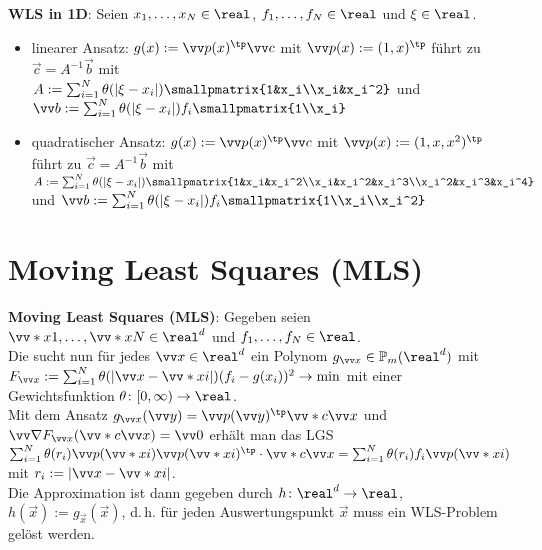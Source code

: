 \textbf{WLS in 1D}:
Seien $x_1, \dotsc, x_N \in \real$, $f_1, \dotsc, f_N \in \real$ und $\xi \in \real$.
\begin{itemize}
    \item
    linearer Ansatz:
    $g(x) := \vec{p}(x)^\tp \vec{c}$ mit $\vec{p}(x) := (1, x)^\tp$
    führt zu $\vec{c} = A^{-1} \vec{b}$ mit\\
    $A := \sum_{i=1}^N \theta(|\xi - x_i|) \smallpmatrix{1&x_i\\x_i&x_i^2}$ und
    $\vec{b} := \sum_{i=1}^N \theta(|\xi - x_i|) f_i \smallpmatrix{1\\x_i}$

    \item
    quadratischer Ansatz:
    $g(x) := \vec{p}(x)^\tp \vec{c}$ mit $\vec{p}(x) := (1, x, x^2)^\tp$
    führt zu $\vec{c} = A^{-1} \vec{b}$ mit\\
    $A := \sum_{i=1}^N \theta(|\xi - x_i|)
    \smallpmatrix{1&x_i&x_i^2\\x_i&x_i^2&x_i^3\\x_i^2&x_i^3&x_i^4}$ und
    $\vec{b} := \sum_{i=1}^N \theta(|\xi - x_i|) f_i \smallpmatrix{1\\x_i\\x_i^2}$
\end{itemize}

\pagebreak

\section{%
    Moving Least Squares (MLS)%
}

\textbf{Moving Least Squares (MLS)}:
Gegeben seien $\vecs{x}{1}, \dotsc, \vecs{x}{N} \in \real^d$ und
$f_1, \dotsc, f_N \in \real$.\\
Die  sucht nun für jedes $\vec{x} \in \real^d$
ein Polynom $g_{\vec{x}} \in \PP_m(\real^d)$ mit\\
$F_{\vec{x}} := \sum_{i=1}^N \theta(|\vec{x} - \vecs{x}{i}|) (f_i - g(x_i))^2 \to \min$
mit einer Gewichtsfunktion $\theta\colon [0, \infty) \to \real$.\\
Mit dem Ansatz $g_{\vec{x}}(\vec{y}) = \vec{p}(\vec{y})^\tp \vecs{c}{\vec{x}}$ und
$\vec{\nabla} F_{\vec{x}}(\vecs{c}{\vec{x}}) = \vec{0}$ erhält man das LGS\\
$\sum_{i=1}^N \theta(r_i) \vec{p}(\vecs{x}{i}) \vec{p}(\vecs{x}{i})^\tp \cdot \vecs{c}{\vec{x}}
= \sum_{i=1}^N \theta(r_i) f_i \vec{p}(\vecs{x}{i})$ mit $r_i := |\vec{x} - \vecs{x}{i}|$.\\
Die Approximation ist dann gegeben durch
$h\colon \real^d \to \real$, $h(\vec{x}) := g_{\vec{x}}(\vec{x})$,
d.\,h. für jeden Auswertungspunkt $\vec{x}$ muss ein WLS-Problem gelöst werden.

